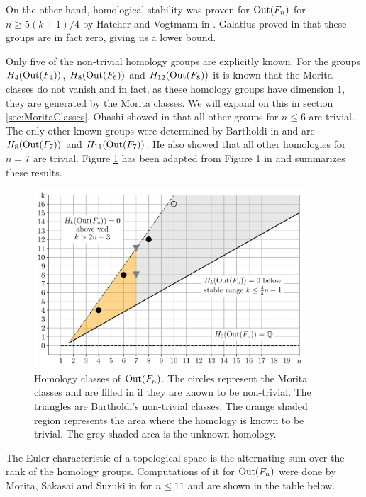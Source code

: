 On the other hand, homological stability was proven for $\operatorname{Out}(F_{n})$ for $n \geq 5 (k+1) / 4$ by Hatcher and Vogtmann in \cite{hatcher04,hatcher98}.
Galatius proved in \cite{galatius11} that these groups are in fact zero, giving us a lower bound.

Only five of the non-trivial homology groups are explicitly known.
For the groups $H_{4}(\operatorname{Out}(F_{4}))$, $H_{8}(\operatorname{Out}(F_{6}))$ and $H_{12}(\operatorname{Out}(F_{8}))$ it is known 
that the Morita classes do not vanish and in fact, as these homology groups have dimension $1$, they are generated by the Morita classes.
We will expand on this in section \ref{sec:MoritaClasses}.
Ohashi showed in \cite{ohashi08} that all other groups for $n \leq 6$ are trivial. 
The only other known groups were determined by Bartholdi in \cite{bartholdi16} and are
$H_{8}(\operatorname{Out}(F_{7}))$ and $H_{11}(\operatorname{Out}(F_{7}))$. He also showed that all other homologies for $n = 7$ are trivial.
Figure \ref{fig:homologyOfOutFn} has been adapted from Figure 1 in \cite{conant16} and summarizes these results.

\begin{figure}[htbp]
	\centering
	\captionsetup{width=0.9\textwidth}
	\includegraphics[width=0.9\textwidth]{./Images/OutFnHomology.pdf}
	\caption{Homology classes of $\operatorname{Out}(F_{n})$. The circles represent the  Morita classes and are filled in if they are known to be non-trivial.
		The triangles are Bartholdi's non-trivial classes.
		The orange shaded region represents the area where the homology is known to be trivial.
		The grey shaded area is the unknown homology.}
	\label{fig:homologyOfOutFn}
\end{figure}

The Euler characteristic of a topological space is the alternating sum over the rank of the homology groups.
Computations of it for $\operatorname{Out}(F_{n})$ were done by Morita, Sakasai and Suzuki in \cite{morita15moduli,morita15euler} for $n \leq 11$ and are shown in the table below.

